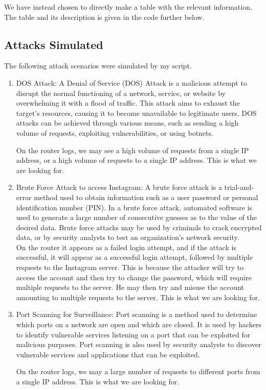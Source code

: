 \documentclass[11pt]{article}
\begin{document}
We have instead chosen to directly make a table with the relevant information. The table and its description is given in the code further below.


\subsection{Attacks Simulated}

The following attack scenarios were simulated by my script.

\begin{enumerate}
    \item DOS Attack: A Denial of Service (DOS) Attack is a malicious attempt to disrupt the normal functioning of a network, service, or website by overwhelming it with a flood of traffic. This attack aims to exhaust the target's resources, causing it to become unavailable to legitimate users. DOS attacks can be achieved through various means, such as sending a high volume of requests, exploiting vulnerabilities, or using botnets.

          On the router logs, we may see a high volume of requests from a single IP address, or a high volume of requests to a single IP address. This is what we are looking for.

    \item Brute Force Attack to access Instagram: A brute force attack is a trial-and-error method used to obtain information such as a user password or personal identification number (PIN). In a brute force attack, automated software is used to generate a large number of consecutive guesses as to the value of the desired data. Brute force attacks may be used by criminals to crack encrypted data, or by security analysts to test an organization's network security.\\

          On the router it appears as a failed login attempt, and if the attack is successful, it will appear as a successful login attempt, followed by multiple requests to the Instagram server. This is because the attacker will try to access the account and then try to change the password, which will require multiple requests to the server. He may then try and misuse the account amounting to multiple requests to the server. This is what we are looking for.

    \item Port Scanning for Surveillance: Port scanning is a method used to determine which ports on a network are open and which are closed. It is used by hackers to identify vulnerable services listening on a port that can be exploited for malicious purposes. Port scanning is also used by security analysts to discover vulnerable services and applications that can be exploited.

          On the router logs, we may a large number of requests to different ports from a single IP address. This is what we are looking for.

\end{enumerate}
\end{document}
